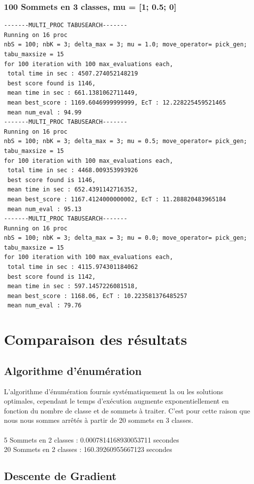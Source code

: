 \documentclass[a4paper]{article}
\begin{document}
\subsubsection{100 Sommets en 3 classes, mu = [1; 0.5; 0]}
\begin{verbatim}
-------MULTI_PROC TABUSEARCH-------
Running on 16 proc
nbS = 100; nbK = 3; delta_max = 3; mu = 1.0; move_operator= pick_gen;
tabu_maxsize = 15
for 100 iteration with 100 max_evaluations each,
 total time in sec : 4507.274052148219
 best score found is 1146,
 mean time in sec : 661.1381062711449,
 mean best_score : 1169.6046999999999, EcT : 12.228225459521465
 mean num_eval : 94.99
-------MULTI_PROC TABUSEARCH-------
Running on 16 proc
nbS = 100; nbK = 3; delta_max = 3; mu = 0.5; move_operator= pick_gen;
tabu_maxsize = 15
for 100 iteration with 100 max_evaluations each,
 total time in sec : 4468.009353993926
 best score found is 1146,
 mean time in sec : 652.4391142716352,
 mean best_score : 1167.4124000000002, EcT : 11.288820483965184
 mean num_eval : 95.13
-------MULTI_PROC TABUSEARCH-------
Running on 16 proc
nbS = 100; nbK = 3; delta_max = 3; mu = 0.0; move_operator= pick_gen;
tabu_maxsize = 15
for 100 iteration with 100 max_evaluations each,
 total time in sec : 4115.974301184062
 best score found is 1142,
 mean time in sec : 597.1457226081518,
 mean best_score : 1168.06, EcT : 10.223581376485257
 mean num_eval : 79.76
\end{verbatim}

\section{Comparaison des résultats}

	\subsection{Algorithme d'énumération}
	L'algorithme d'énumération fournis systématiquement la ou les solutions optimales, cependant le temps d’exécution augmente exponentiellement en fonction du nombre de classe et de sommets à traiter. C'est pour cette raison que nous nous sommes arrêtés à partir de 20 sommets en 3 classes.\\\\
	5 Sommets en 2 classes : 0.0007814168930053711 secondes\\
	20 Sommets en 2 classes : 160.39260955667123 secondes

	\subsection{Descente de Gradient}
\end{document}
